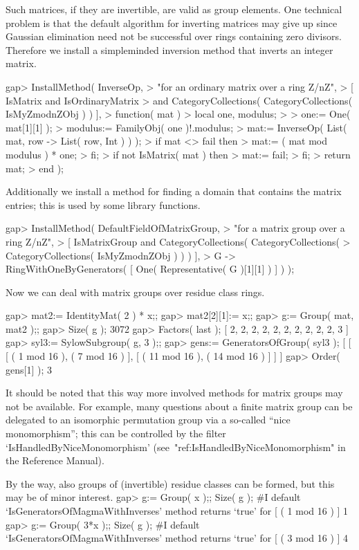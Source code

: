 Such matrices, if they are invertible, are valid as group elements.
One technical problem is that the default algorithm for inverting matrices
may give up since Gaussian elimination need not be successful over rings
containing zero divisors.
Therefore we install a simpleminded inversion method that inverts an integer
matrix.

\beginexample
gap> InstallMethod( InverseOp,
>    "for an ordinary matrix over a ring Z/nZ",
>    [ IsMatrix and IsOrdinaryMatrix
>          and CategoryCollections( CategoryCollections( IsMyZmodnZObj ) ) ],
>    function( mat )
>    local one, modulus;
> 
>    one:= One( mat[1][1] );
>    modulus:= FamilyObj( one )!.modulus;
>    mat:= InverseOp( List( mat, row -> List( row, Int ) ) );
>    if mat <> fail then
>      mat:= ( mat mod modulus ) * one;
>    fi;
>    if not IsMatrix( mat ) then
>      mat:= fail;
>    fi;
>    return mat;
>    end );
\endexample

Additionally we install a method for finding a domain that contains the
matrix entries; this is used by some {\GAP} library functions.

\beginexample
gap> InstallMethod( DefaultFieldOfMatrixGroup,
>     "for a matrix group over a ring Z/nZ",
>     [ IsMatrixGroup and CategoryCollections( CategoryCollections(
>           CategoryCollections( IsMyZmodnZObj ) ) ) ],
>     G -> RingWithOneByGenerators( [ One( Representative( G )[1][1] ) ] ) );
\endexample

Now we can deal with matrix groups over residue class rings.

\beginexample
gap> mat2:= IdentityMat( 2 ) * x;;
gap> mat2[2][1]:= x;;
gap> g:= Group( mat, mat2 );;
gap> Size( g );
3072
gap> Factors( last );
[ 2, 2, 2, 2, 2, 2, 2, 2, 2, 2, 3 ]
gap> syl3:= SylowSubgroup( g, 3 );;
gap> gens:= GeneratorsOfGroup( syl3 );
[ [ [ ( 1 mod 16 ), ( 7 mod 16 ) ], [ ( 11 mod 16 ), ( 14 mod 16 ) ] ] ]
gap> Order( gens[1] );
3
\endexample

It should be noted that this way more involved methods for matrix groups
may not be available.
For example, many questions about a finite matrix group can be delegated
to an isomorphic permutation group via a so-called ``nice monomorphism'';
this can be controlled by the filter `IsHandledByNiceMonomorphism'
(see~"ref:IsHandledByNiceMonomorphism" in the {\GAP} Reference Manual).

By the way, also groups of (invertible) residue classes can be formed,
but this may be of minor interest.
\beginexample
gap> g:= Group( x );;  Size( g );
#I  default `IsGeneratorsOfMagmaWithInverses' method returns `true' for 
[ ( 1 mod 16 ) ]
1
gap> g:= Group( 3*x );;  Size( g );
#I  default `IsGeneratorsOfMagmaWithInverses' method returns `true' for 
[ ( 3 mod 16 ) ]
4
\endexample


